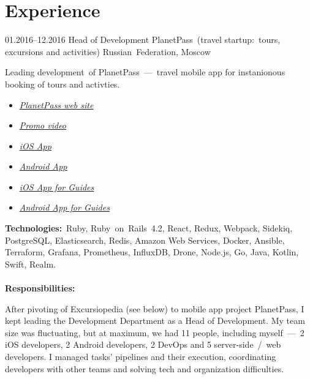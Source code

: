 \documentclass[12pt,a4paper,final]{moderncv}
\begin{document}
\section{Experience}

\cventry
{01.2016--12.2016}
{Head of Development}
{PlanetPass~(travel startup:~tours, excursions and activities)}
{Russian~Federation, Moscow}
{}
{
  Leading development~of PlanetPass~---~travel mobile app for instanionous booking of tours and activties.
  \bigskip
  \begin{itemize}
    \item \underline{\href{https://planetpass.com}{\itshape PlanetPass web site}}
    \item \underline{\href{https://vimeo.com/176452074}{\itshape Promo video}}
    \item \underline{\href{https://itunes.apple.com/us/app/planetpass-city-walks-with-guides/id1087995218}{\itshape iOS App}}
    \item \underline{\href{https://play.google.com/store/apps/details?id=com.excursiopedia.planetpass}{\itshape Android App}}
    \item \underline{\href{https://itunes.apple.com/us/app/tool-for-guides/id1129160306}{\itshape iOS App for Guides}}
    \item \underline{\href{https://play.google.com/store/apps/details?id=com.excursiopedia.guide}{\itshape Android App for Guides}}
  \end{itemize}
  \bigskip
  \textbf{Technologies:}~Ruby, Ruby~on~Rails~4.2, React, Redux, Webpack, Sidekiq, PostgreSQL, Elasticsearch, Redis, Amazon Web Services, Docker, Ansible, Terraform, Grafana, Prometheus, InfluxDB, Drone, Node.js, Go, Java, Kotlin, Swift, Realm.
  \\\\
  \textbf{Responsibilities:}\\
  {\parindent=1cm
    After pivoting of Excursiopedia (see below) to mobile app project PlanetPass, I kept leading the Development Department as a Head of Development. My team size was fluctuating, but at maximum, we had 11 people, including myself~---~2 iOS developers, 2 Android developers, 2 DevOps and 5 server-side~/~web developers. I managed tasks' pipelines and their execution, coordinating developers with other teams and solving tech and organization difficulties.

}}
\end{document}
